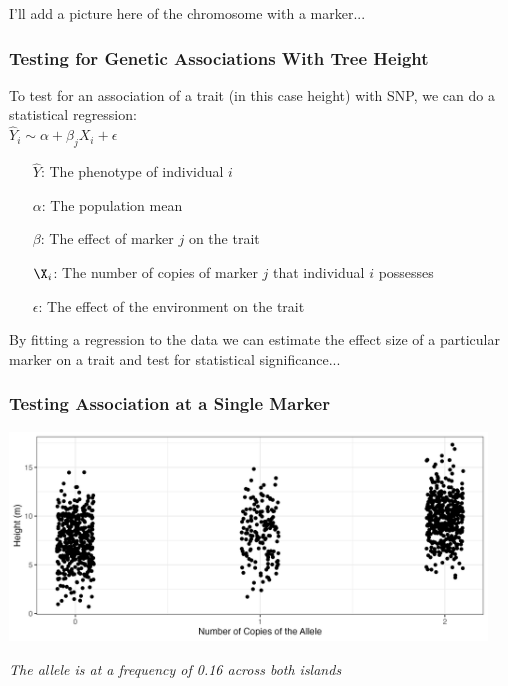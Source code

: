 \documentclass[xcolor=dvipsnames]{beamer}
\begin{document}
 
 \begin{frame}
 
 I'll add a picture here of the chromosome with a marker...
 
 \end{frame}
 

\begin{frame}
\frametitle{Testing for Genetic Associations With Tree Height}

To test for an association of a trait (in this case height) with SNP, we can do a statistical regression:\\

\vspace{15pt}
\Large 
\centering $\hat{Y}_i \sim \alpha  + \beta_j X_i + \epsilon$ \pause
\vspace{15pt}
\begin{itemize}
\normalsize
	\item[$\hat{Y}$:] The phenotype of individual $i$
	\item[$\alpha$:] The population mean
	\item[$\beta$:] The effect of marker $j$ on the trait 
	\item[$\X_i$:] The number of copies of marker $j$ that individual $i$ possesses
	\item[$\epsilon$:] The effect of the environment on the trait
	
	\end{itemize} 
	
\vspace{15pt}

\normalsize By fitting a regression to the data we can estimate the effect size of a particular marker on a trait and test for statistical significance...

\end{frame}

\begin{frame}
	\frametitle{Testing Association at a Single Marker}
	
							\includegraphics[keepaspectratio, width  = 0.95\textwidth]{img/snp_mod_noLine}				
	
\textit{	The allele is at a frequency of 0.16 across both islands}
\end{frame}
\end{document}
